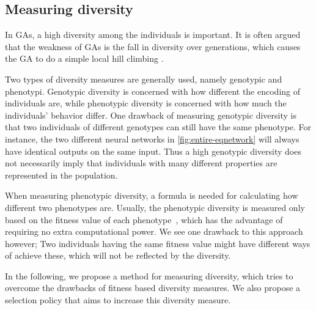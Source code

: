 \subsection{Measuring diversity}
In GAs, a high diversity among the individuals is important. It is often argued that the weakness of GAs is the fall in diversity over generations, which causes the GA to do a simple local hill climbing \citpls{}.

Two types of diversity measures are generally used, namely genotypic and phenotypi\cite{Nguyen:2006:ASPGP}. Genotypic diversity is concerned with how different the encoding of individuals are, while phenotypic diversity is concerned with how much the individuals' behavior differ. One drawback of measuring genotypic diversity is that two individuals of different genotypes can still have the same phenotype. For instance, the two different neural networks in \cref{fig:entire-eqnetwork} will always have identical outputs on the same input. Thus a high genotypic diversity does not necessarily imply that individuals with many different properties are represented in the population.
%

%
When measuring phenotypic diversity, a formula is needed for calculating how different two phenotypes are.
Usually, the phenotypic diversity is measured only based on the fitness value of each phenotype~\cite{Nguyen:2006:ASPGP}, which has the advantage of requiring no extra computational power. 
We see one drawback to this approach however; Two individuals having the same fitness value might have different ways of achieve these, which will not be reflected by the diversity. 

In the following, we propose a method for measuring diversity, which tries to overcome the drawbacks of fitness based diversity measures.
We also propose a selection policy that aims to increase this diversity measure.
